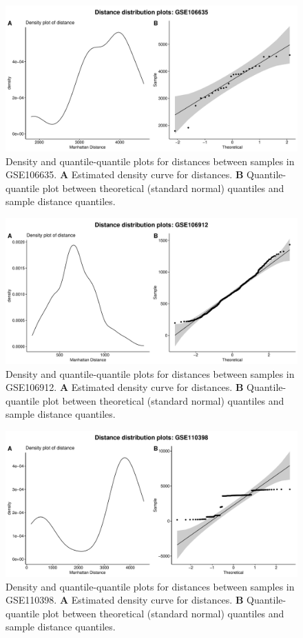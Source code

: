\documentclass[10pt,letterpaper]{article}\usepackage[]{graphicx}\usepackage[]{color}
\begin{document}
\begin{figure}[H]
	\includegraphics[width=\textwidth]{manhattan-distance_hist_GSE106635.pdf}
	\caption{Density and quantile-quantile plots for distances between samples in GSE106635. \textbf{A} Estimated density curve for distances. \textbf{B} Quantile-quantile plot between theoretical (standard normal) quantiles and sample distance quantiles.}
\end{figure}

\begin{figure}[H]
	\includegraphics[width=\textwidth]{manhattan-distance_hist_GSE106912.pdf}
	\caption{Density and quantile-quantile plots for distances between samples in GSE106912. \textbf{A} Estimated density curve for distances. \textbf{B} Quantile-quantile plot between theoretical (standard normal) quantiles and sample distance quantiles.}
\end{figure}

\begin{figure}[H]
	\includegraphics[width=\textwidth]{manhattan-distance_hist_GSE110398.pdf}
	\caption{Density and quantile-quantile plots for distances between samples in GSE110398. \textbf{A} Estimated density curve for distances. \textbf{B} Quantile-quantile plot between theoretical (standard normal) quantiles and sample distance quantiles.}
\end{figure}
\end{document}
